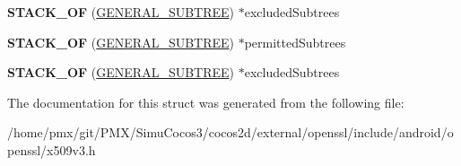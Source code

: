 \begin{DoxyCompactItemize}
\mbox{\label{structNAME__CONSTRAINTS__st_a92b0238c5c37f7d919e2fb9d23dd44c2}} 
{\bfseries S\+T\+A\+C\+K\+\_\+\+OF} (\hyperlink{structGENERAL__SUBTREE__st}{G\+E\+N\+E\+R\+A\+L\+\_\+\+S\+U\+B\+T\+R\+EE}) $\ast$excluded\+Subtrees
\item 
\mbox{\label{structNAME__CONSTRAINTS__st_a018745d61a5d6f8feedf7b6e693cce83}} 
{\bfseries S\+T\+A\+C\+K\+\_\+\+OF} (\hyperlink{structGENERAL__SUBTREE__st}{G\+E\+N\+E\+R\+A\+L\+\_\+\+S\+U\+B\+T\+R\+EE}) $\ast$permitted\+Subtrees
\item 
\mbox{\label{structNAME__CONSTRAINTS__st_a92b0238c5c37f7d919e2fb9d23dd44c2}} 
{\bfseries S\+T\+A\+C\+K\+\_\+\+OF} (\hyperlink{structGENERAL__SUBTREE__st}{G\+E\+N\+E\+R\+A\+L\+\_\+\+S\+U\+B\+T\+R\+EE}) $\ast$excluded\+Subtrees
\end{DoxyCompactItemize}


The documentation for this struct was generated from the following file\+:\begin{DoxyCompactItemize}
\item 
/home/pmx/git/\+P\+M\+X/\+Simu\+Cocos3/cocos2d/external/openssl/include/android/openssl/x509v3.\+h\end{DoxyCompactItemize}
